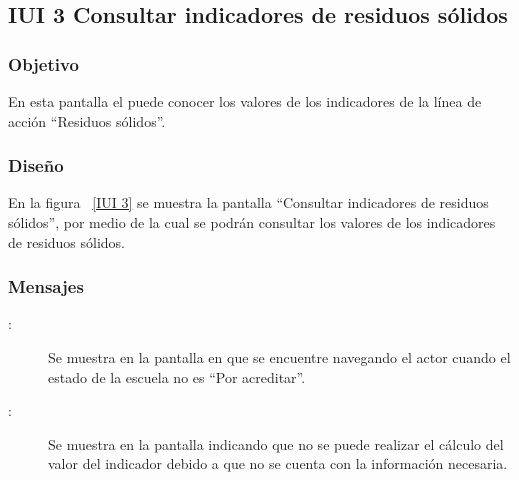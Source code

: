\subsection{IUI 3 Consultar indicadores de residuos sólidos}
\subsubsection{Objetivo}
	
	En esta pantalla el  puede conocer los valores de los indicadores
	de la línea de acción ``Residuos sólidos''.	

\subsubsection{Diseño}

    En la figura ~\ref{IUI 3} se muestra la pantalla ``Consultar indicadores de residuos sólidos'', por medio de la cual 
    se podrán consultar los valores de los indicadores de residuos sólidos.


\subsubsection{Mensajes}

	
\begin{description}
	\item[:] Se muestra en la pantalla en que se encuentre navegando el actor cuando el estado de la escuela no es ``Por acreditar''.
	\item[:] Se muestra en la pantalla  indicando que no se puede realizar el cálculo del valor del indicador
				     debido a que no se cuenta con la información necesaria.
\end{description}

